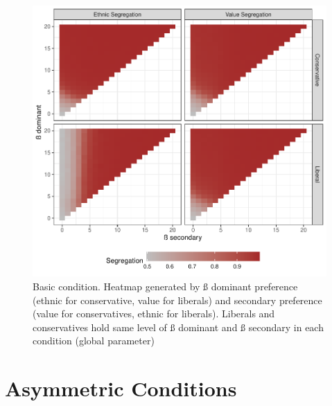 \documentclass[
]{article}
\begin{document}
\begin{figure}[H]

{\centering \includegraphics{ev_rum_files/figure-latex/htmp-1} 

}

\caption{Basic condition. Heatmap generated by ß dominant preference (ethnic for conservative, value for liberals) and secondary preference (value for conservatives, ethnic for liberals). Liberals and conservatives hold same level of ß dominant and ß secondary in each condition (global parameter)}\label{fig:htmp}
\end{figure}

\hypertarget{asymmetric-conditions}{%
\section{Asymmetric Conditions}\label{asymmetric-conditions}}
\end{document}
